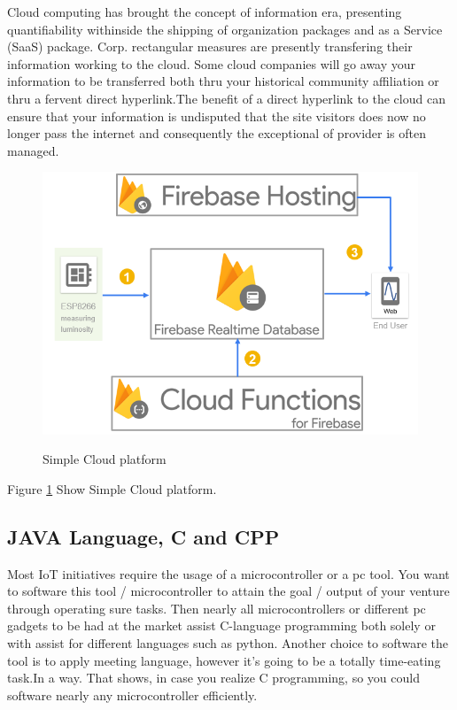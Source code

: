 \documentclass[12pt,a4paper]{article}
\begin{document}
Cloud computing has brought the concept of information era, presenting quantifiability withinside the
shipping of organization packages and as a Service (SaaS) package. Corp. rectangular measures are
presently transfering their information working to the cloud. Some cloud companies will go away your
information to be transferred both thru your historical community affiliation or thru a fervent
direct hyperlink.The benefit of a direct hyperlink to the cloud can ensure that your information is
undisputed that the site visitors does now no longer pass the internet and consequently the exceptional of provider is often
managed.\\

\begin{figure}[H]
	\centering
	\includegraphics[width=\linewidth]{cloudsystem.png}\\
	\caption{Simple Cloud platform}
	\label{fig:3.2.2}
\end{figure}
\begin{center}
Figure \ref{fig:3.2.2} Show Simple Cloud platform.
\end{center}

\subsection{JAVA Language, C and CPP }
\hspace{0.5cm} Most IoT initiatives require the usage of a microcontroller or a pc tool. You want to
software this tool / microcontroller to attain the goal / output of your venture through operating
sure tasks. Then nearly all microcontrollers or different pc gadgets to be had at the market
assist C-language programming both solely or with assist for different languages such as
python. Another choice to software the tool is to apply meeting language, however it’s going to be a totally time-eating task.In a way. That shows, in case you realize C programming, so you could software nearly any
microcontroller efficiently.
\end{document}

